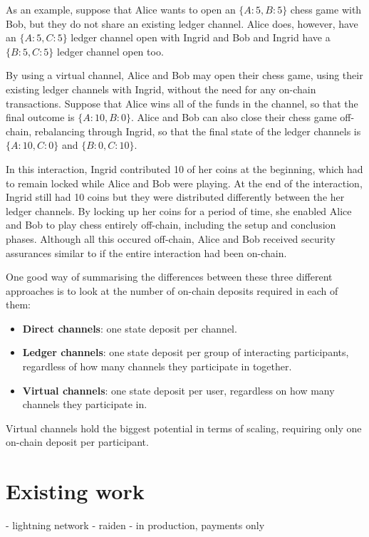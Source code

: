 \documentclass{article}
\begin{document}
As an example, suppose that Alice wants to open an $\{A:5, B:5\}$ chess game with Bob, but they do not share an existing ledger channel.
Alice does, however, have an $\{A:5, C:5\}$ ledger channel open with Ingrid and Bob and Ingrid have a $\{B:5, C:5\}$ ledger channel open too.

By using a virtual channel, Alice and Bob may open their chess game, using their existing ledger channels with Ingrid, without the need for any on-chain transactions.
Suppose that Alice wins all of the funds in the channel, so that the final outcome is $\{A: 10, B: 0\}$.
Alice and Bob can also close their chess game off-chain, rebalancing through Ingrid, so that the final state of the ledger channels is $\{A: 10, C: 0\}$ and $\{B: 0, C: 10\}$.

In this interaction, Ingrid contributed 10 of her coins at the beginning, which had to remain locked while Alice and Bob were playing.
At the end of the interaction, Ingrid still had 10 coins but they were distributed differently between the her ledger channels.
By locking up her coins for a period of time, she enabled Alice and Bob to play chess entirely off-chain, including the setup and conclusion phases.
Although all this occured off-chain, Alice and Bob received security assurances similar to if the entire interaction had been on-chain.

One good way of summarising the differences between these three different approaches is to look at the number of on-chain deposits required in each of them:
\begin{itemize}
  \item \textbf{Direct channels}: one state deposit per channel.
  \item \textbf{Ledger channels}: one state deposit per group of interacting participants, regardless of how many channels they participate in together.
  \item \textbf{Virtual channels}: one state deposit per user, regardless on how many channels they participate in.
\end{itemize}
Virtual channels hold the biggest potential in terms of scaling, requiring only one on-chain deposit per participant.

\section{Existing work}

- lightning network
- raiden
- in production, payments only
\end{document}
